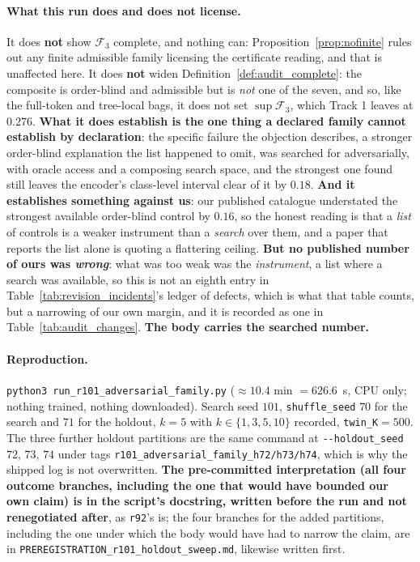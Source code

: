 \paragraph{What this run does and does not license.} It does \textbf{not} show $\mathcal{F}_3$ complete, and nothing can: Proposition~\ref{prop:nofinite} rules out any finite admissible family licensing the certificate reading, and that is unaffected here. It does \textbf{not} widen Definition~\ref{def:audit_complete}: the composite is order-blind and admissible but is \emph{not} one of the seven, and so, like the full-token and tree-local bags, it does not set $\sup\mathcal{F}_3$, which Track 1 leaves at $0.276$. \textbf{What it does establish is the one thing a declared family cannot establish by declaration}: the specific failure the objection describes, a stronger order-blind explanation the list happened to omit, was searched for adversarially, with oracle access and a composing search space, and the strongest one found still leaves the encoder's class-level interval clear of it by $0.18$. \textbf{And it establishes something against us}: our published catalogue understated the strongest available order-blind control by $0.16$, so the honest reading is that a \emph{list} of controls is a weaker instrument than a \emph{search} over them, and a paper that reports the list alone is quoting a flattering ceiling. \textbf{But no published number of ours was \emph{wrong}}: what was too weak was the \emph{instrument}, a list where a search was available, so this is not an eighth entry in Table~\ref{tab:revision_incidents}'s ledger of defects, which is what that table counts, but a narrowing of our own margin, and it is recorded as one in Table~\ref{tab:audit_changes}. \textbf{The body carries the searched number.}

\paragraph{Reproduction.} \texttt{python3 run\_r101\_adversarial\_family.py} ($\approx10.4$ min $=626.6$~s, CPU only; nothing trained, nothing downloaded). Search seed $101$, \texttt{shuffle\_seed} $70$ for the search and $71$ for the holdout, $k{=}5$ with $k\in\{1,3,5,10\}$ recorded, \texttt{twin\_K}${=}500$. The three further holdout partitions are the same command at \texttt{-{}-holdout\_seed} $72$, $73$, $74$ under tags \texttt{r101\_adversarial\_family\_h72/h73/h74}, which is why the shipped log is not overwritten. \textbf{The pre-committed interpretation (all four outcome branches, including the one that would have bounded our own claim) is in the script's docstring, written before the run and not renegotiated after}, as \texttt{r92}'s is; the four branches for the added partitions, including the one under which the body would have had to narrow the claim, are in \texttt{PREREGISTRATION\_r101\_holdout\_sweep.md}, likewise written first.

